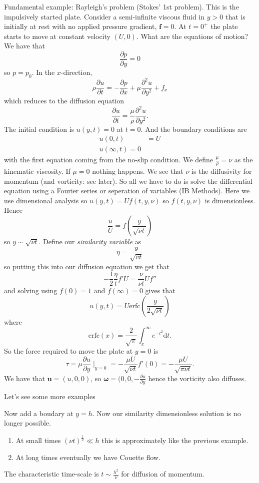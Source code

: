 \documentclass{article}
\begin{document}
\begin{example}
  Fundamental example: Rayleigh's problem (Stokes' 1st problem). This is the impulsively started plate. Consider a semi-infinite viscous fluid in $ y>0 $ that is initially at rest with no applied pressure gradient, $ \mathbf f = 0 $. At $ t=0^+ $ the plate starts to move at constant velocity $ (U,0) $. What are the equations of motion? We have that
  \[
	  \frac{\partial p }{\partial y} = 0
  \]
  so $ p = p_0 $. In the $ x $-direction,
  \[
	  \rho\frac{\partial u }{\partial t} = -\frac{\partial p}{\partial x} + \mu\frac{\partial ^2 u }{\partial y^2} + f_x
  \]
  which reduces to the diffusion equation
  \[
	  \frac{\partial u}{\partial t} = \frac\mu\rho \frac{\partial^2 u}{\partial y^2}.
  \]
  The initial condition is $ u(y,t) = 0 $ at $ t=0 $. And the boundary conditions are 
  \begin{align*}
	  u(0,t) &= U\\
	  u(\infty, t ) = 0
  \end{align*}
  with the first equation coming from the no-slip condition. We define $ \frac \mu \rho=\nu $ as the kinematic viscosity. If $ \mu = 0 $ nothing happens. We see that $ \nu $ is the diffusivity for momentum (and vorticity: see later). So all we have to do is solve the differential equation using a Fourier series or seperation of variables (IB Methods). Here we use dimensional analysis so $ u(y,t) = Uf(t,y,\nu) $ so $ f(t,y,\nu) $ is dimensionless. Hence
  \[
	  \frac uU = f\left(\frac y{\sqrt{\nu t}}\right)
  \]
  so $ y\sim \sqrt{\nu t} $. Define our \textit{similarity variable} as
  \[
	  \eta = \frac{y}{\sqrt{vt}}
  \]
  so putting this into our diffusion equation we get that
  \[
	  -\frac 12 \frac \eta t f' U = \frac{\nu}{\nu t}Uf''
  \]
  and solving using $ f(0) = 1 $ and $ f(\infty) = 0 $ gives that
  \[
	  u(y,t) = U \mathrm{erfc}\left(\frac y{2\sqrt {\nu t}}\right)
  \]
  where
  \[
	  \mathrm{erfc}(x) = \frac 2{\sqrt \pi} \int^\infty_x e^{-t^2} \mathrm dt.
  \]
  So the force required to move the plate at $ y=0 $ is
  \[
	  \tau = \mu\frac{\partial u}{\partial y}\mid_{y=0} = -\frac{\mu U}{\sqrt{\nu t}} f'(0) = -\frac{\mu U}{\sqrt{\pi \nu t}}.
  \]
  We have that $ \mathbf u = (u,0,0) $, so $ \boldsymbol\omega = (0,0,-\frac{\partial u}{\partial y} $ hence the vorticity also diffuses.
\end{example}
Let's see some more examples
\begin{example}
  Now add a boudary at $ y=h $. Now our similarity dimensionless solution is no longer possible.
  \begin{enumerate}
	  \item At small times $ (\nu t)^{\frac 12} \ll h $ this is approximately like the previous example.
	  \item At long times eventually we have Couette flow.
  \end{enumerate}
  The characteristic time-scale is $ t\sim \frac {h^2}\nu $ for diffusion of momentum.
\end{example}
\end{document}
